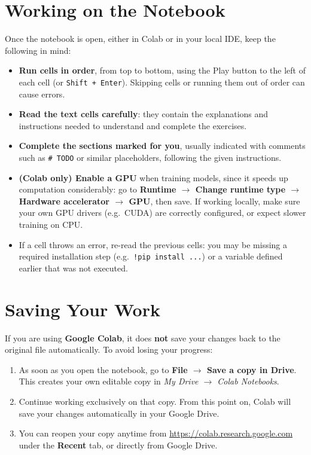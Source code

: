 \documentclass[11pt,a4paper]{article}
\begin{document}
\section{Working on the Notebook}

Once the notebook is open, either in Colab or in your local IDE, keep the following in mind:

\begin{itemize}
    \item \textbf{Run cells in order}, from top to bottom, using the Play button to the left of each cell (or \texttt{Shift + Enter}). Skipping cells or running them out of order can cause errors.
    \item \textbf{Read the text cells carefully}: they contain the explanations and instructions needed to understand and complete the exercises.
    \item \textbf{Complete the sections marked for you}, usually indicated with comments such as \texttt{\# TODO} or similar placeholders, following the given instructions.
    \item \textbf{(Colab only) Enable a GPU} when training models, since it speeds up computation considerably: go to \textbf{Runtime $\rightarrow$ Change runtime type $\rightarrow$ Hardware accelerator $\rightarrow$ GPU}, then save. If working locally, make sure your own GPU drivers (e.g.\ CUDA) are correctly configured, or expect slower training on CPU.
    \item If a cell throws an error, re-read the previous cells: you may be missing a required installation step (e.g.\ \texttt{!pip install ...}) or a variable defined earlier that was not executed.
\end{itemize}

\section{Saving Your Work}
\label{sec:saving}

If you are using \textbf{Google Colab}, it does \textbf{not} save your changes back to the original file automatically. To avoid losing your progress:

\begin{enumerate}
    \item As soon as you open the notebook, go to \textbf{File $\rightarrow$ Save a copy in Drive}. This creates your own editable copy in \textit{My Drive $\rightarrow$ Colab Notebooks}.
    \item Continue working exclusively on that copy. From this point on, Colab will save your changes automatically in your Google Drive.
    \item You can reopen your copy anytime from \url{https://colab.research.google.com} under the \textbf{Recent} tab, or directly from Google Drive.
\end{enumerate}
\end{document}
